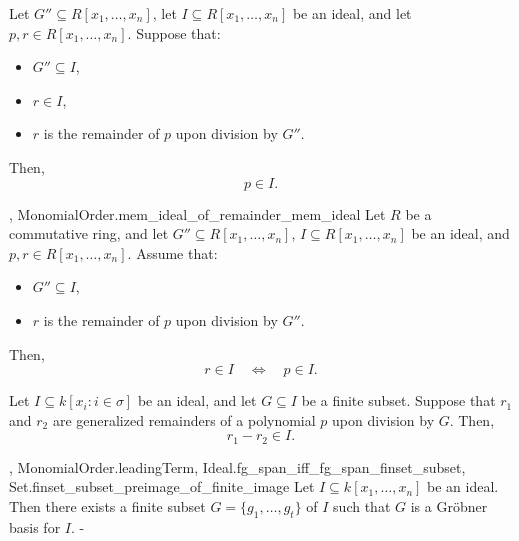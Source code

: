 \begin{lemma}\label{MonomialOrder.mem_ideal_of_remainder_mem_ideal}
  \leanok
  Let \( G'' \subseteq R[x_1, \dots, x_n] \), let \( I \subseteq R[x_1, \dots, x_n] \) be an ideal,
and let \( p, r \in R[x_1, \dots, x_n] \). Suppose that:
\begin{itemize}
\item \( G'' \subseteq I \),
\item \( r \in I \),
\item \( r \) is the remainder of \( p \) upon division by \( G'' \).
\end{itemize}
Then,
\[
p \in I.
\]

\end{lemma}

\begin{lemma}\label{MonomialOrder.remainder_mem_ideal_iff}
  \leanok
  ,
{MonomialOrder.mem_ideal_of_remainder_mem_ideal}
  Let \( R \) be a commutative ring, and let \( G'' \subseteq R[x_1, \dots, x_n] \), \( I \subseteq R[x_1, \dots, x_n] \) be an ideal, and \( p, r \in R[x_1, \dots, x_n] \).
Assume that:
\begin{itemize}
\item \( G'' \subseteq I \),
\item \( r \) is the remainder of \( p \) upon division by \( G'' \).
\end{itemize}
Then,
\[
r \in I \quad \Longleftrightarrow \quad p \in I.
\]

\end{lemma}

\begin{lemma}\label{MonomialOrder.remainder_sub_remainder_mem_ideal}
  \leanok
  Let \( I \subseteq k[x_i : i \in \sigma] \) be an ideal, and let \( G \subseteq I \) be a finite subset.
Suppose that \( r_1 \) and \( r_2 \) are generalized remainders of a polynomial \( p \) upon division by \( G \).
Then,
\[
r_1 - r_2 \in I.
\]

\end{lemma}

\begin{lemma}\label{MonomialOrder.exists_groebner_basis}
  \leanok
  ,
{MonomialOrder.leadingTerm},
{Ideal.fg_span_iff_fg_span_finset_subset},
{Set.finset_subset_preimage_of_finite_image}
  Let \( I \subseteq k[x_1, \ldots, x_n] \) be an ideal. Then there exists a finite subset \( G = \{g_1, \ldots, g_t\} \) of \( I \) such that \( G \) is a Gröbner basis for \( I \).
-
\end{lemma}

